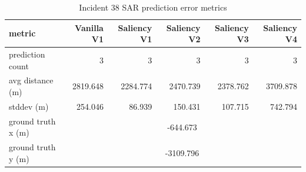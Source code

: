 \begin{table}[ht]
\centering
\caption{Incident 38 SAR prediction error metrics}
\label{tab:sar-incident-38}
\begin{tabular}{lrrrrr}
\hline
metric & Vanilla V1 & Saliency V1 & Saliency V2 & Saliency V3 & Saliency V4 \\
\hline
prediction count & 3 & 3 & 3 & 3 & 3 \\
avg distance (m) & 2819.648 & 2284.774 & 2470.739 & 2378.762 & 3709.878 \\
stddev (m) & 254.046 & 86.939 & 150.431 & 107.715 & 742.794 \\
ground truth x (m) & \multicolumn{5}{c}{-644.673} \\
ground truth y (m) & \multicolumn{5}{c}{-3109.796} \\
\hline
\end{tabular}
\end{table}
